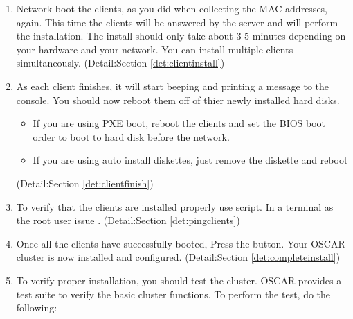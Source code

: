 \begin {enumerate}
\item Network boot the clients, as you did when collecting the MAC addresses,
again. This time the clients will be answered by the server and will perform
the installation. The install should only take about 3-5 minutes depending on 
your hardware and your network. You can install multiple clients simultaneously.
(Detail:Section \ref{det:clientinstall})

\item As each client finishes, it will start beeping and printing a message to the 
console. You should now reboot them off of thier newly installed hard disks.

        \begin{itemize}
        \item If you are using PXE boot, reboot the clients and set the BIOS
        boot order to boot to hard disk before the network.
        \item If you are using auto install diskettes, just remove the diskette
        and reboot
        \end{itemize}
(Detail:Section \ref{det:clientfinish})

\item To verify that the clients are installed properly use  script.
In a terminal as the root user issue .
(Detail:Section \ref{det:pingclients})

\item Once all the clients have successfully booted, Press the 
 button. Your OSCAR cluster is
now installed and configured.
(Detail:Section \ref{det:completeinstall})

\item To verify proper installation, you should test the cluster.
OSCAR provides a test suite to verify the basic cluster
functions. To perform the test, do the following:


\end{enumerate}
